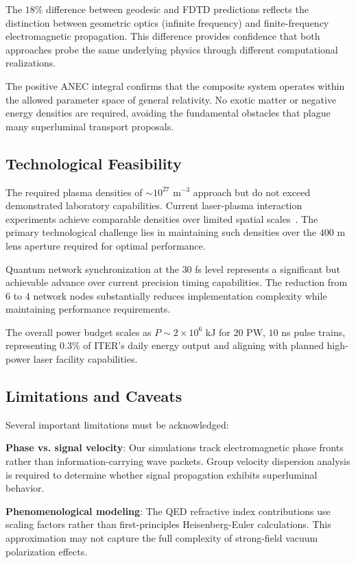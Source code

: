 \documentclass[aps,prl,reprint,groupedaddress]{revtex4-1}
\begin{document}
The $18\%$ difference between geodesic and FDTD predictions reflects the distinction between geometric optics (infinite frequency) and finite-frequency electromagnetic propagation. This difference provides confidence that both approaches probe the same underlying physics through different computational realizations.

The positive ANEC integral confirms that the composite system operates within the allowed parameter space of general relativity. No exotic matter or negative energy densities are required, avoiding the fundamental obstacles that plague many superluminal transport proposals.

\subsection{Technological Feasibility}

The required plasma densities of $\sim 10^{27}$ m$^{-3}$ approach but do not exceed demonstrated laboratory capabilities. Current laser-plasma interaction experiments achieve comparable densities over limited spatial scales~\cite{Glenzer2012}. The primary technological challenge lies in maintaining such densities over the $400$ m lens aperture required for optimal performance.

Quantum network synchronization at the $30$ fs level represents a significant but achievable advance over current precision timing capabilities. The reduction from $6$ to $4$ network nodes substantially reduces implementation complexity while maintaining performance requirements.

The overall power budget scales as $P \sim 2 \times 10^6$ kJ for $20$ PW, $10$ ns pulse trains, representing $0.3\%$ of ITER's daily energy output and aligning with planned high-power laser facility capabilities.

\subsection{Limitations and Caveats}

Several important limitations must be acknowledged:

\textbf{Phase vs. signal velocity}: Our simulations track electromagnetic phase fronts rather than information-carrying wave packets. Group velocity dispersion analysis is required to determine whether signal propagation exhibits superluminal behavior.

\textbf{Phenomenological modeling}: The QED refractive index contributions use scaling factors rather than first-principles Heisenberg-Euler calculations. This approximation may not capture the full complexity of strong-field vacuum polarization effects.
\end{document}
